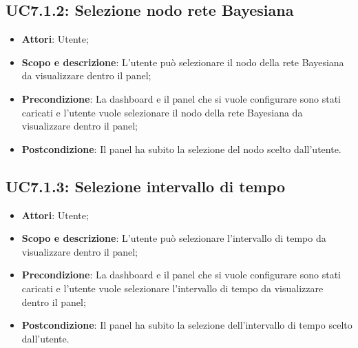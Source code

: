 \subsection{UC7.1.2: Selezione nodo rete Bayesiana }
\hypertarget{UC7.1.2}{}
\begin{itemize}
	\item \textbf{Attori}: Utente;
	\item \textbf{Scopo e descrizione}: L'utente può selezionare il nodo della rete Bayesiana da visualizzare dentro il panel;
	\item \textbf{Precondizione}: La dashboard e il panel che si vuole configurare sono stati caricati e l'utente vuole selezionare il nodo della rete Bayesiana da visualizzare dentro il panel;
	\item \textbf{Postcondizione}: Il panel ha subito la selezione del nodo scelto dall'utente.
\end{itemize}
\subsection{UC7.1.3: Selezione intervallo di tempo  }
\hypertarget{UC7.1.3}{}
\begin{itemize}
	\item \textbf{Attori}: Utente;
	\item \textbf{Scopo e descrizione}: L'utente può selezionare l'intervallo di tempo da visualizzare dentro il panel;
	\item \textbf{Precondizione}: La dashboard e il panel che si vuole configurare sono stati caricati e l'utente vuole selezionare l'intervallo di tempo da visualizzare dentro il panel;
	\item \textbf{Postcondizione}: Il panel ha subito la selezione dell'intervallo di tempo scelto dall'utente.
\end{itemize}
